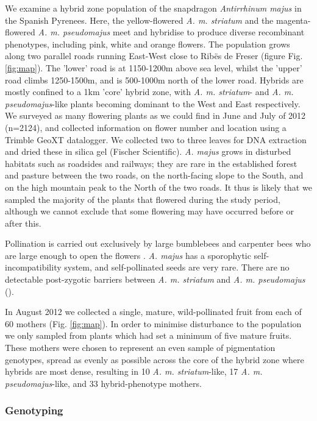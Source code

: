 \documentclass[10pt, a4paper, twocolumn]{article} %
\begin{document}
We examine a hybrid zone population of the snapdragon \textit{Antirrhinum majus} in the Spanish Pyrenees. Here, the yellow-flowered \textit{A. m. striatum} and the magenta-flowered \textit{A. m. pseudomajus} meet and hybridise to produce diverse recombinant phenotypes, including pink, white and orange flowers.
The population grows along two parallel roads running East-West close to Rib\"{e}s de Freser (figure Fig. \ref{fig:map}). The ’lower’ road is at 1150-1200m above sea level, whilst the ’upper’ road climbs 1250-1500m, and is 500-1000m north of the lower road. Hybrids are mostly confined to a 1km ’core’ hybrid zone, with \textit{A. m. striatum}- and \textit{A. m. pseudomajus}-like plants becoming dominant to the West and East respectively. We surveyed as many flowering plants as we could find in June and July of 2012 (n=2124), and collected information on flower number and location using a Trimble GeoXT datalogger. We collected two to three leaves for DNA extraction and dried these in silica gel (Fischer Scientific). \textit{A. majus} grows in disturbed habitats such as roadsides and railways; they are rare in the established forest and pasture between the two roads, on the north-facing slope to the South, and on the high mountain peak to the North of the two roads. It thus is likely that we sampled the majority of the plants that flowered during the study period, although we cannot exclude that some flowering may have occurred before or after this. 

Pollination is carried out exclusively by large bumblebees and carpenter bees who are large enough to open the flowers \cite{vargas2010occluded, andalo2019prevalence}. \textit{A. majus} has a sporophytic self-incompatibility system, and self-pollinated seeds are very rare. There are no detectable post-zygotic barriers between \textit{A. m. striatum} and \textit{A. m. pseudomajus} (\cite{andalo2010post}).

In August 2012 we collected a single, mature, wild-pollinated fruit from each of 60 mothers (Fig. \ref{fig:map}). In order to minimise disturbance to the population we only sampled from plants which had set a minimum of five mature fruits. These mothers were chosen to represent an even sample of pigmentation genotypes, spread as evenly as possible across the core of the hybrid zone where hybrids are most dense, resulting in 10 \textit{A. m. striatum}-like, 17 \textit{A. m. pseudomajus}-like, and 33 hybrid-phenotype mothers.

\subsubsection{Genotyping}
\end{document}
